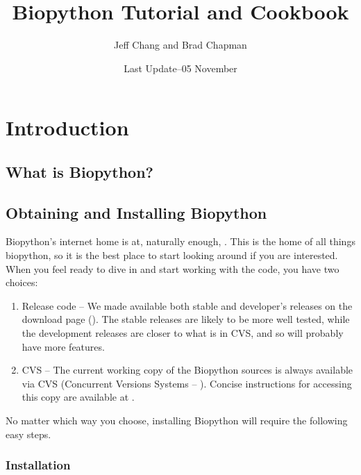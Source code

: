 \documentclass{article}
\begin{document}
\title{Biopython
Tutorial and Cookbook}
\author{Jeff Chang and Brad Chapman}
\date{Last Update--05 November}

\maketitle
\tableofcontents

\section{Introduction}

\subsection{What is Biopython?}

\subsection{Obtaining and Installing Biopython}

Biopython's internet home is at, naturally enough,  . This is the home of all things biopython, so it is the best place to start looking around if you are interested. When you feel ready to dive in and start working with the code, you have two choices:

\begin{enumerate}

\item Release code -- We made available both stable and developer's releases on the download page (). The stable releases are likely to be more well tested, while the development releases are closer to what is in CVS, and so will probably have more features.

\item CVS -- The current working copy of the Biopython sources is always available via CVS (Concurrent Versions Systems -- ). Concise instructions for accessing this copy are available at .

\end{enumerate}

No matter which way you choose, installing Biopython will require the following easy steps.

\subsubsection{Installation}
\end{document}
